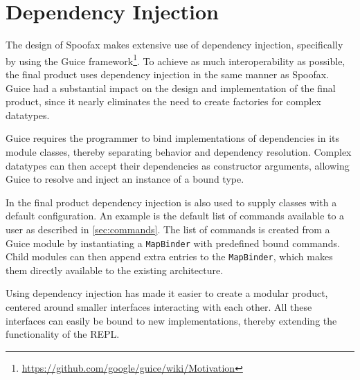 \section{Dependency Injection}
\label{sec:injection}

The design of Spoofax makes extensive use of dependency injection, specifically
by using the Guice framework\footnote{\url{https://github.com/google/guice/wiki/Motivation}}.
To achieve as much interoperability as possible, the final product
uses dependency injection in the same manner as Spoofax. Guice had a
substantial impact on the design and implementation of the final product, since
it nearly eliminates the need to create factories for complex datatypes.

Guice requires the programmer to bind implementations of dependencies in its
module classes, thereby separating behavior and dependency resolution.  Complex
datatypes can then accept their dependencies as constructor arguments, allowing
Guice to resolve and inject an instance of a bound type.

In the final product dependency injection is also used to supply classes
with a default configuration.  An example is the default list of commands
available to a user as described in \cref{sec:commands}.  The list of commands
is created from a Guice module by instantiating a \texttt{MapBinder} with
predefined bound commands. Child modules can then append extra entries to the
\texttt{MapBinder}, which makes them directly available to the existing
architecture.

Using dependency injection has made it easier to create a modular product,
centered around smaller interfaces interacting with each other. All these
interfaces can easily be bound to new implementations, thereby extending the
functionality of the REPL.
